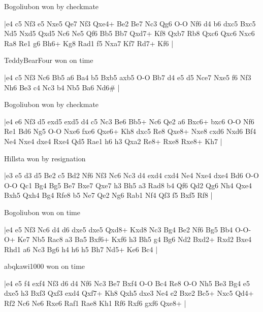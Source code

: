 \showboard

Bogoliubon won by checkmate

\makegametitle
|e4 c5 Nf3 e5 Nxe5 Qe7 Nf3 Qxe4+ Be2 Be7 Nc3 Qg6 O-O Nf6 d4 b6 dxc5 Bxc5 Nd5 Nxd5 Qxd5 Nc6 Ne5 Qf6 Bb5 Bb7 Qxd7+ Kf8 Qxb7 Rb8 Qxc6 Qxc6 Nxc6 Ra8 Re1 g6 Bh6+ Kg8 Rad1 f5 Nxa7 Kf7 Rd7+ Kf6  |

\showboard

TeddyBearFour won on time

\makegametitle
|e4 c5 Nf3 Nc6 Bb5 a6 Ba4 b5 Bxb5 axb5 O-O Bb7 d4 e5 d5 Nce7 Nxe5 f6 Nf3 Nh6 Be3 c4 Nc3 b4 Nb5 Ba6 Nd6\#  |

\showboard

Bogoliubon won by checkmate

\makegametitle
|e4 e6 Nf3 d5 exd5 exd5 d4 c5 Nc3 Be6 Bb5+ Nc6 Qe2 a6 Bxc6+ bxc6 O-O Nf6 Re1 Bd6 Ng5 O-O Nxe6 fxe6 Qxe6+ Kh8 dxc5 Re8 Qxe8+ Nxe8 cxd6 Nxd6 Bf4 Ne4 Nxe4 dxe4 Rxe4 Qd5 Rae1 h6 h3 Qxa2 Re8+ Rxe8 Rxe8+ Kh7  |

\showboard

Hillsta won by resignation

\makegametitle
|e3 e5 d3 d5 Be2 c5 Bd2 Nf6 Nf3 Nc6 Nc3 d4 exd4 cxd4 Ne4 Nxe4 dxe4 Bd6 O-O O-O Qc1 Bg4 Bg5 Be7 Bxe7 Qxe7 h3 Bh5 a3 Rad8 b4 Qf6 Qd2 Qg6 Nh4 Qxe4 Bxh5 Qxh4 Bg4 Rfe8 b5 Ne7 Qe2 Ng6 Rab1 Nf4 Qf3 f5 Bxf5 Rf8  |

\showboard

Bogoliubon won on time

\makegametitle
|e4 e5 Nf3 Nc6 d4 d6 dxe5 dxe5 Qxd8+ Kxd8 Nc3 Bg4 Be2 Nf6 Bg5 Bb4 O-O-O+ Ke7 Nb5 Rac8 a3 Ba5 Bxf6+ Kxf6 h3 Bh5 g4 Bg6 Nd2 Bxd2+ Rxd2 Bxe4 Rhd1 a6 Nc3 Bg6 h4 h6 h5 Bh7 Nd5+ Ke6 Bc4  |

\showboard

abqkawi1000 won on time

\makegametitle
|e4 e5 f4 exf4 Nf3 d6 d4 Nf6 Nc3 Be7 Bxf4 O-O Bc4 Re8 O-O Nh5 Be3 Bg4 e5 dxe5 h3 Bxf3 Qxf3 exd4 Qxf7+ Kh8 Qxh5 dxe3 Ne4 e2 Bxe2 Bc5+ Nxc5 Qd4+ Rf2 Nc6 Ne6 Rxe6 Raf1 Rae8 Kh1 Rf6 Rxf6 gxf6 Qxe8+  |

